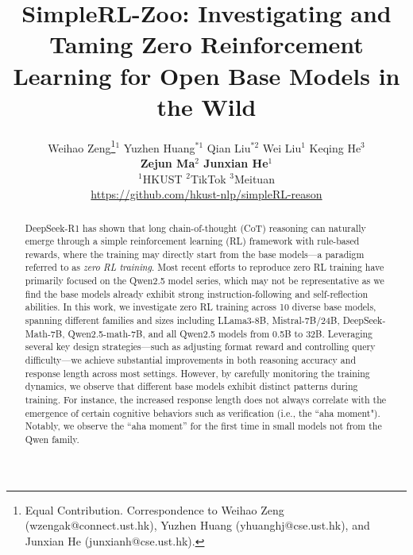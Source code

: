 \documentclass{article} %
\title{SimpleRL-Zoo: Investigating and Taming Zero Reinforcement Learning for Open Base Models in the Wild}
\author{Weihao Zeng\thanks{Equal Contribution. Correspondence to Weihao Zeng (wzengak@connect.ust.hk), Yuzhen Huang (yhuanghj@cse.ust.hk), and Junxian He (junxianh@cse.ust.hk).}\hspace{4pt}$^1$ \quad Yuzhen Huang$^{*1}$ \quad Qian Liu$^{*2}$ \quad
Wei Liu$^1$ \quad
Keqing He$^3$ \\ \textbf{Zejun Ma$^2$ \quad Junxian He$^1$}\\
$^1$HKUST \quad $^2$TikTok \quad $^3$Meituan\\
\href{https://github.com/hkust-nlp/simpleRL-reason}{https://github.com/hkust-nlp/simpleRL-reason}
}
\begin{document}
\ifcolmsubmission
\linenumbers
\fi

\maketitle

\begin{abstract}

DeepSeek-R1 has shown that long chain-of-thought (CoT) reasoning can naturally emerge through a simple reinforcement learning (RL) framework with rule-based rewards, where the training may directly start from the base models—a paradigm referred to as \emph{zero RL training}. Most recent efforts to reproduce zero RL training have primarily focused on the Qwen2.5 model series, which may not be representative as we find the base models already exhibit strong instruction-following and self-reflection abilities.
In this work, we investigate zero RL training across 10 diverse base models, spanning different families and sizes including LLama3-8B, Mistral-7B/24B, DeepSeek-Math-7B, Qwen2.5-math-7B, and all Qwen2.5 models from 0.5B to 32B. 
Leveraging several key design strategies—such as adjusting format reward and controlling query difficulty—we achieve substantial improvements in both reasoning accuracy and response length across most settings.
However, by carefully monitoring the training dynamics, we observe that different base models exhibit distinct patterns during training. For instance, the increased response length does not always correlate with the emergence of certain cognitive behaviors such as verification (i.e., the ``aha moment"). Notably, we observe the ``aha moment'' for the first time in small models not from the Qwen family.

\end{abstract}
\end{document}
